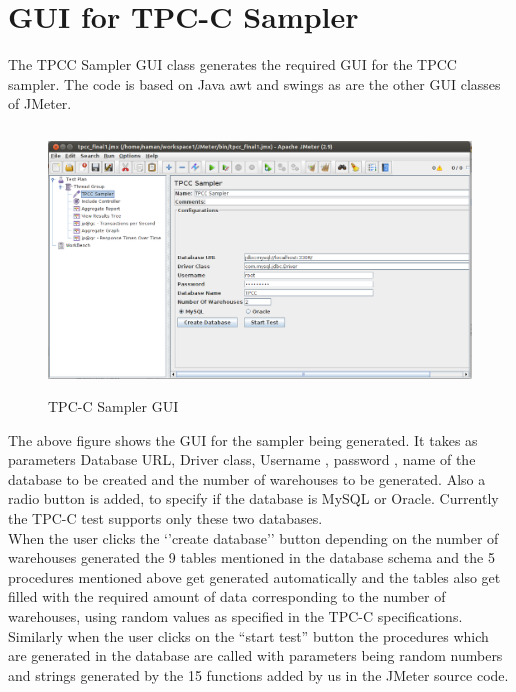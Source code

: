 \documentclass[12pt]{book}
\begin{document}
  \section{GUI for TPC-C Sampler}
  
  The TPCC Sampler GUI  class generates the required GUI for the TPCC sampler. The code is based on Java awt and swings as are the other GUI classes of JMeter.


  \begin{figure}[H]
   \centering
   \includegraphics[width=15cm, height=7cm]{images/tpcc_71}
   \caption{TPC-C Sampler GUI\label{fig:fig64_JMeter}}
  \end{figure}
  
  The above figure shows the GUI for the sampler being generated. It takes as parameters Database URL, Driver class, Username , password , name of the database 
  to be created and the number of warehouses to be generated. Also a radio button is added, to specify if the database is MySQL or Oracle. Currently the TPC-C test
  supports only  these two databases.\\
  When the user  clicks the ‘’create database’’ button depending on the number of warehouses generated the 9 tables mentioned in the database schema and the 5
  procedures mentioned above get generated automatically and the tables also get filled with the required amount of data corresponding to the number of warehouses,
  using random values as specified in the TPC-C specifications.\\
  Similarly when the user clicks on the “start test” button the procedures which are generated in the database are called with parameters being random numbers and 
  strings generated by the 15 functions added by us in the JMeter source code.\\

  
  
\end{document}
